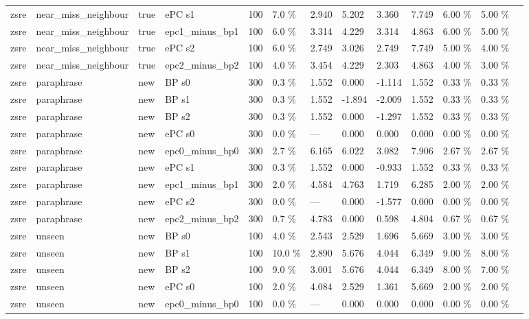 \documentclass[10pt,a4paper]{article}
\begin{document}
\begin{center}
\begin{tabularx}{\textwidth}{@{}p{}XXXXXXXXXXXX@{}}
zsre & near\_miss\_neighbour & true & ePC s1 & 100 & 7.0 \% & 2.940 & 5.202 & 3.360 & 7.749 & 6.00 \% & 5.00 \% &  \\
zsre & near\_miss\_neighbour & true & epc1\_minus\_bp1 & 100 & 6.0 \% & 3.314 & 4.229 & 3.314 & 4.863 & 6.00 \% & 5.00 \% &  \\
zsre & near\_miss\_neighbour & true & ePC s2 & 100 & 6.0 \% & 2.749 & 3.026 & 2.749 & 7.749 & 5.00 \% & 4.00 \% &  \\
zsre & near\_miss\_neighbour & true & epc2\_minus\_bp2 & 100 & 4.0 \% & 3.454 & 4.229 & 2.303 & 4.863 & 4.00 \% & 3.00 \% &  \\
zsre & paraphrase & new & BP s0 & 300 & 0.3 \% & 1.552 & 0.000 & -1.114 & 1.552 & 0.33 \% & 0.33 \% &  \\
zsre & paraphrase & new & BP s1 & 300 & 0.3 \% & 1.552 & -1.894 & -2.009 & 1.552 & 0.33 \% & 0.33 \% &  \\
zsre & paraphrase & new & BP s2 & 300 & 0.3 \% & 1.552 & 0.000 & -1.297 & 1.552 & 0.33 \% & 0.33 \% &  \\
zsre & paraphrase & new & ePC s0 & 300 & 0.0 \% & — & 0.000 & 0.000 & 0.000 & 0.00 \% & 0.00 \% &  \\
zsre & paraphrase & new & epc0\_minus\_bp0 & 300 & 2.7 \% & 6.165 & 6.022 & 3.082 & 7.906 & 2.67 \% & 2.67 \% &  \\
zsre & paraphrase & new & ePC s1 & 300 & 0.3 \% & 1.552 & 0.000 & -0.933 & 1.552 & 0.33 \% & 0.33 \% &  \\
zsre & paraphrase & new & epc1\_minus\_bp1 & 300 & 2.0 \% & 4.584 & 4.763 & 1.719 & 6.285 & 2.00 \% & 2.00 \% &  \\
zsre & paraphrase & new & ePC s2 & 300 & 0.0 \% & — & 0.000 & -1.577 & 0.000 & 0.00 \% & 0.00 \% &  \\
zsre & paraphrase & new & epc2\_minus\_bp2 & 300 & 0.7 \% & 4.783 & 0.000 & 0.598 & 4.804 & 0.67 \% & 0.67 \% &  \\
zsre & unseen & new & BP s0 & 100 & 4.0 \% & 2.543 & 2.529 & 1.696 & 5.669 & 3.00 \% & 3.00 \% &  \\
zsre & unseen & new & BP s1 & 100 & 10.0 \% & 2.890 & 5.676 & 4.044 & 6.349 & 9.00 \% & 8.00 \% &  \\
zsre & unseen & new & BP s2 & 100 & 9.0 \% & 3.001 & 5.676 & 4.044 & 6.349 & 8.00 \% & 7.00 \% &  \\
zsre & unseen & new & ePC s0 & 100 & 2.0 \% & 4.084 & 2.529 & 1.361 & 5.669 & 2.00 \% & 2.00 \% &  \\
zsre & unseen & new & epc0\_minus\_bp0 & 100 & 0.0 \% & — & 0.000 & 0.000 & 0.000 & 0.00 \% & 0.00 \% &  \\

\end{tabularx}
\end{center}
\end{document}
